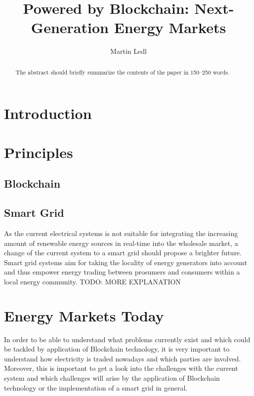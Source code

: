 \documentclass[runningheads]{llncs}
\begin{document}
%
\title{Powered by Blockchain: Next-Generation Energy Markets}
%
%
\author{Martin Ledl}
%
%
%
\maketitle              %
%
\begin{abstract}
The abstract should briefly summarize the contents of the paper in
150--250 words.

\end{abstract}
%
%
%
\section{Introduction}

\section{Principles}

\subsection{Blockchain}

\subsection{Smart Grid}
As the current electrical systems is not suitable for integrating the increasing amount of renewable energy sources in real-time into the wholesale market, a change of the current system to a smart grid should propose a brighter future. Smart grid systems aim for taking the locality of energy generators into account and thus empower energy trading between prosumers and consumers within a local energy community. \cite{mengelkamp_lem}
TODO: MORE EXPLANATION

\section{Energy Markets Today}
In order to be able to understand what problems currently exist and which could be tackled by application of Blockchain technology, it is very important to understand how electricity is traded nowadays and which parties are involved. Moreover, this is important to get a look into the challenges with the current system and which challenges will arise by the application of Blockchain technology or the implementation of a smart grid in general.
\end{document}
